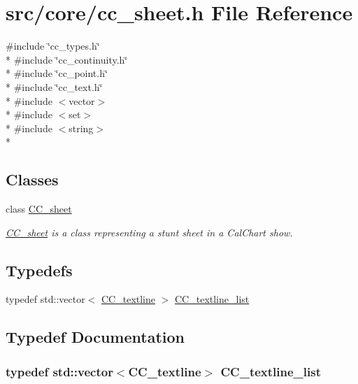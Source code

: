 \hypertarget{a00212}{\section{src/core/cc\-\_\-sheet.h File Reference}
\label{a00212}
}
{\ttfamily \#include \char`\"{}cc\-\_\-types.\-h\char`\"{}}\\*
{\ttfamily \#include \char`\"{}cc\-\_\-continuity.\-h\char`\"{}}\\*
{\ttfamily \#include \char`\"{}cc\-\_\-point.\-h\char`\"{}}\\*
{\ttfamily \#include \char`\"{}cc\-\_\-text.\-h\char`\"{}}\\*
{\ttfamily \#include $<$vector$>$}\\*
{\ttfamily \#include $<$set$>$}\\*
{\ttfamily \#include $<$string$>$}\\*
\subsection*{Classes}
\begin{DoxyCompactItemize}
\item 
class \hyperlink{a00045}{C\-C\-\_\-sheet}
\begin{DoxyCompactList}\small\item\em \hyperlink{a00045}{C\-C\-\_\-sheet} is a class representing a stunt sheet in a Cal\-Chart show. \end{DoxyCompactList}\end{DoxyCompactItemize}
\subsection*{Typedefs}
\begin{DoxyCompactItemize}
\item 
typedef std\-::vector$<$ \hyperlink{a00048}{C\-C\-\_\-textline} $>$ \hyperlink{a00212_ae492d9b165445899a5c5a3128e58f0cf}{C\-C\-\_\-textline\-\_\-list}
\end{DoxyCompactItemize}


\subsection{Typedef Documentation}
\hypertarget{a00212_ae492d9b165445899a5c5a3128e58f0cf}{
\subsubsection[{C\-C\-\_\-textline\-\_\-list}]{\setlength{\rightskip}{0pt plus 5cm}typedef std\-::vector$<${\bf C\-C\-\_\-textline}$>$ {\bf C\-C\-\_\-textline\-\_\-list}}}\label{a00212_ae492d9b165445899a5c5a3128e58f0cf}
